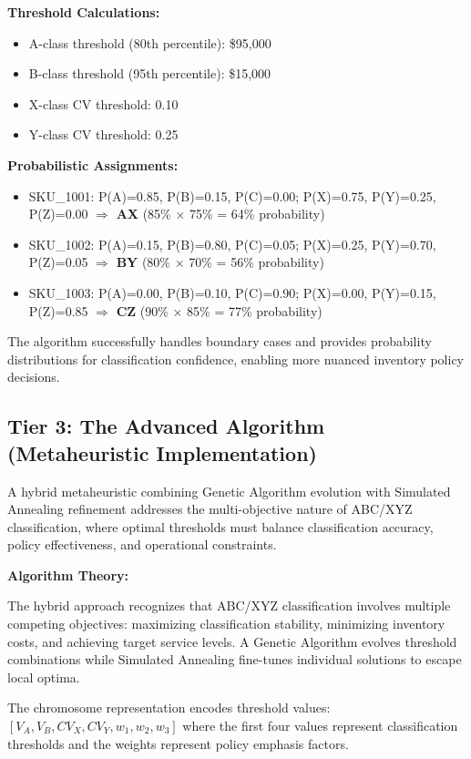 \documentclass{article}
\begin{document}
\textbf{Threshold Calculations:}
\begin{itemize}
    \item A-class threshold (80th percentile): \$95,000
    \item B-class threshold (95th percentile): \$15,000
    \item X-class CV threshold: 0.10
    \item Y-class CV threshold: 0.25
\end{itemize}

\textbf{Probabilistic Assignments:}
\begin{itemize}
    \item SKU\_1001: P(A)=0.85, P(B)=0.15, P(C)=0.00; P(X)=0.75, P(Y)=0.25, P(Z)=0.00 $\Rightarrow$ \textbf{AX} (85\% × 75\% = 64\% probability)
    \item SKU\_1002: P(A)=0.15, P(B)=0.80, P(C)=0.05; P(X)=0.25, P(Y)=0.70, P(Z)=0.05 $\Rightarrow$ \textbf{BY} (80\% × 70\% = 56\% probability)
    \item SKU\_1003: P(A)=0.00, P(B)=0.10, P(C)=0.90; P(X)=0.00, P(Y)=0.15, P(Z)=0.85 $\Rightarrow$ \textbf{CZ} (90\% × 85\% = 77\% probability)
\end{itemize}

The algorithm successfully handles boundary cases and provides probability distributions for classification confidence, enabling more nuanced inventory policy decisions.

\subsection{Tier 3: The Advanced Algorithm (Metaheuristic Implementation)}

A hybrid metaheuristic combining Genetic Algorithm evolution with Simulated Annealing refinement addresses the multi-objective nature of ABC/XYZ classification, where optimal thresholds must balance classification accuracy, policy effectiveness, and operational constraints.

\textbf{Algorithm Theory:}

The hybrid approach recognizes that ABC/XYZ classification involves multiple competing objectives: maximizing classification stability, minimizing inventory costs, and achieving target service levels. A Genetic Algorithm evolves threshold combinations while Simulated Annealing fine-tunes individual solutions to escape local optima.

The chromosome representation encodes threshold values: $[V_A, V_B, CV_X, CV_Y, w_1, w_2, w_3]$ where the first four values represent classification thresholds and the weights represent policy emphasis factors.
\end{document}
